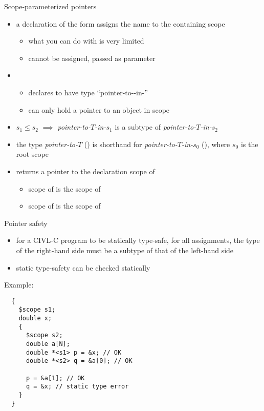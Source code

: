 \documentclass[t]{beamer}
\begin{document}
\begin{frame}{Scope-parameterized pointers}
  \begin{itemize}
  \item a declaration of the form  assigns the name
     to the containing scope
    \begin{itemize}
    \item what you can do with  is very limited
    \item cannot be assigned, passed as parameter
    \end{itemize}
  \item {}
    \begin{itemize}
    \item declares  to have type ``pointer-to--in-''
    \item {} can only hold a pointer to an object in scope 
    \end{itemize}
  \item $s_1\leq s_2$ $\implies$
    \textit{pointer-to-$T$-in-$s_1$} \alert{is a subtype of}
    \textit{pointer-to-$T$-in-$s_2$}
  \item the type \textit{pointer-to-$T$} () is shorthand for
    \textit{pointer-to-$T$-in-$s_0$} (), where $s_0$
    is the \alert{root scope}
  \item {} returns a pointer to the declaration scope of 
    \begin{itemize}
    \item scope of  is the scope of 
    \item scope of  is the scope of 
    \end{itemize}
  \end{itemize}
\end{frame}

\begin{frame}[containsverbatim]{Pointer safety}
  \begin{itemize}
  \item for a CIVL-C program to be \alert{statically type-safe},
    for all assignments, the type of the right-hand side must be a subtype
    of that of the left-hand side
  \item static type-safety can be checked statically
  \end{itemize}
  
  Example:
  
  \begin{mycbox}{7cm}
\begin{verbatim}
  {
    $scope s1;
    double x;
    {
      $scope s2;
      double a[N];
      double *<s1> p = &x; // OK
      double *<s2> q = &a[0]; // OK
      
      p = &a[1]; // OK
      q = &x; // static type error
    }
  }
\end{verbatim}
  \end{mycbox}
\end{frame}
\end{document}
